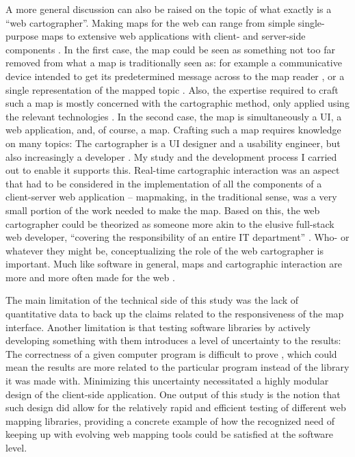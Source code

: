 A more general discussion can also be raised on the topic of what exactly is
a \enquote{web cartographer}.
Making maps for the web can range from simple
single-purpose maps to extensive web applications with
client- and server-side components \parencite{vee2017, mai2017}.
In the first case,
the map could be seen as something not too far removed from
what a map is traditionally seen as: for example a communicative
device intended to get its predetermined message across to the map reader
\parencite{kol1969},
or a single representation of the mapped topic \parencite{tyn1992}.
Also, the expertise required to craft such a map is mostly concerned with
the cartographic method, only applied using the relevant technologies \parencite{rot2021}.
In the second case,
the map is simultaneously a UI, a web application, and, of course, a map.
Crafting such a map requires knowledge on many topics:
The cartographer is a UI designer and a usability engineer,
but also increasingly a developer \parencite{rot2017, mai2017}.
My study and the development process I carried out to enable it supports this.
Real-time cartographic interaction was an aspect that had to be considered
in the implementation of all the components of a client-server web application --
mapmaking, in the traditional sense, was a very small portion of the work
needed to make the map.
Based on this,
the web cartographer could be theorized as
someone more akin to the elusive full-stack web developer,
\enquote{covering the responsibility of an entire IT
department} \parencite[p.~370]{tai2021}.
Who- or whatever they might be, conceptualizing the role of the web cartographer is important.
Much like software in general, maps and cartographic interaction
are more and more often made for the web \parencite{tai2017, rot2021, vee2017}.

The main limitation of the technical side of this study
was the lack of quantitative data to back up
the claims related to the responsiveness of the map interface.
Another limitation is that testing software libraries by
actively developing something with them introduces
a level of uncertainty to the results:
The correctness of a given computer program is difficult to prove
\parencite{dij1970, amm2016},
which could mean the results are more related to the particular program
instead of the library it was made with.
Minimizing this uncertainty necessitated
a highly modular design of the client-side application.
One output of this study is the notion that such design did allow for
the relatively rapid and efficient testing of different web mapping libraries,
providing a concrete example of
how the recognized need of keeping up with evolving web mapping tools \parencite{rot2014, rot2021}
could be satisfied at the software level.


